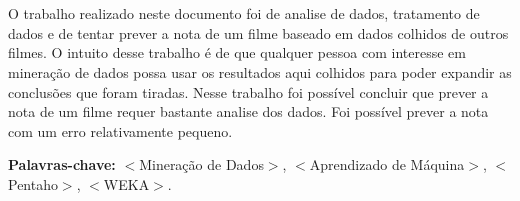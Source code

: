 \section*{}
O trabalho realizado neste documento foi de analise de dados, tratamento de dados e de  tentar prever a nota de um filme baseado em dados colhidos de outros filmes. O intuito desse trabalho é de que qualquer pessoa com interesse em mineração de dados possa usar os resultados aqui colhidos para poder expandir as conclusões que foram tiradas. Nesse trabalho foi possível concluir que prever a nota de um filme requer bastante analise dos dados. Foi possível prever a nota com um erro relativamente pequeno.

{\bf Palavras-chave:} $<$Mineração de Dados$>$,  $<$Aprendizado de Máquina$>$, $<$Pentaho$>$, $<$WEKA$>$.